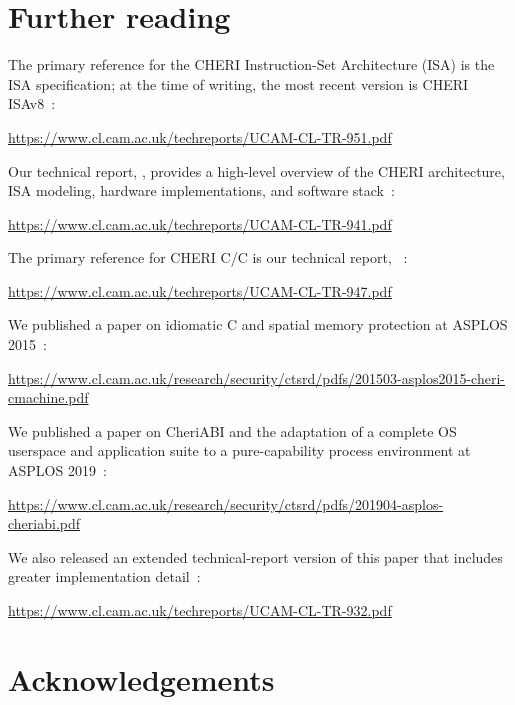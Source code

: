\documentclass[12pt,twoside,openright,a4paper]{article}
\newcommand{\note}[2]{{\color{blue}[ Note: #1 - #2]}}
\renewcommand{\note}[2]{\relax\ifhmode\unskip\fi}
\newcommand{\rwnote}[1]{\note{#1}{Robert W.}}
\newcommand*{\cpp}{\texorpdfstring{C\textsmaller[2]{\protect\nolinebreak[4]\hspace{-.05em}\raisebox{.45ex}{\textbf{++}}}}{C++}}
\newcommand*{\COrCpp}{C/\cpp{}}
\newcommand*{\purecapCOrCpp}{CHERI \COrCpp{}}
\begin{document}
\section{Further reading}
\label{sec:further_reading}

The primary reference for the CHERI Instruction-Set Architecture (ISA) is the
ISA specification; at the time of writing, the most recent version is CHERI
ISAv8~\cite{UCAM-CL-TR-951}:

\smallskip
\noindent
\url{https://www.cl.cam.ac.uk/techreports/UCAM-CL-TR-951.pdf}
\smallskip

\noindent
Our technical report, \textit{}, provides a high-level
overview of the CHERI architecture, ISA modeling, hardware implementations,
and software stack~\cite{UCAM-CL-TR-941}:

\smallskip
\noindent
\url{https://www.cl.cam.ac.uk/techreports/UCAM-CL-TR-941.pdf}
\smallskip

\noindent
The primary reference for \purecapCOrCpp{} is our technical report,
\textit{}~\cite{UCAM-CL-TR-947}:

\smallskip
\noindent
\url{https://www.cl.cam.ac.uk/techreports/UCAM-CL-TR-947.pdf}
\smallskip

\noindent
We published a paper on idiomatic C and spatial memory protection at ASPLOS
2015~\cite{ChisnallCPDP11}:

\smallskip
\noindent
\url{https://www.cl.cam.ac.uk/research/security/ctsrd/pdfs/201503-asplos2015-cheri-cmachine.pdf}
\smallskip

\noindent
We published a paper on CheriABI and the adaptation of a complete OS userspace
and application suite to a pure-capability process environment at ASPLOS
2019~\cite{davis2019:cheriabi}:

\smallskip
\noindent
\url{https://www.cl.cam.ac.uk/research/security/ctsrd/pdfs/201904-asplos-cheriabi.pdf}
\smallskip

\noindent
We also released an extended technical-report version of this paper that
includes greater implementation detail~\cite{UCAM-CL-TR-932}:

\smallskip
\noindent
\url{https://www.cl.cam.ac.uk/techreports/UCAM-CL-TR-932.pdf}
\smallskip

\section{Acknowledgements}

\rwnote{Update feedback acknowledgments here.}
\end{document}
